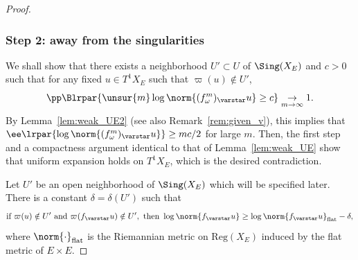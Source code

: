 \begin{proof}
\subsubsection*{Step 2: away from the singularities}
We shall show that there exists a neighborhood $U'\subset U$ of $\Sing(X_E)$
and $c>0$ such that
for any fixed $u\in T^1X_E$ such that $\varpi(u)\notin U'$,
\begin{equation}\label{eq:UE_proba}
\pp\Blrpar{\unsur{m}\log \norm{(f_\omega^m)_\varstar u} \geq c} \underset{m\to\infty}{\to} 1.
\end{equation}
By Lemma~\ref{lem:weak_UE2} (see also Remark~\ref{rem:given_v}), this implies that
$\ee\lrpar{\log \norm{(f_\omega^m)_\varstar u}}\geq mc/2$ for large $m$. Then, the first step and
a compactness argument identical to that of
Lemma~\ref{lem:weak_UE} show that uniform expansion holds on $T^1X_E$,
which is the desired contradiction.

Let $U'$ be an open neighborhood of $\Sing(X_E)$ which will be specified later.
There is a constant $\delta = \delta(U')$ such that
\begin{equation}\label{eq:flat1}
\text{if } \varpi(u)\notin U'\text{ and } \varpi(f_\varstar u)\notin U', \text{ then }
\log\norm{f_\varstar u} \geq \log\norm{f_\varstar u}_{\mathrm{flat}} - \delta,
\end{equation}
where $\norm{\cdot}_{\mathrm{flat}}$ is the Riemannian metric on $\mathrm{Reg}(X_E)$ induced by the flat metric of
$E\times E$.


\end{proof}
